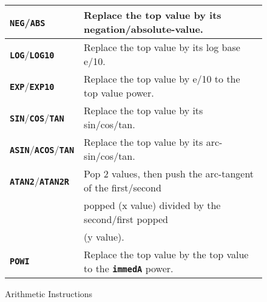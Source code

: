 \documentclass[12pt]{article}
\newcommand{\TT}[1]{{\tt \bfseries #1}}
\newlength{\figurewidth}
\newenvironment{boxedfigure}[1][!btp]%
	{\begin{figure*}[#1]
	 \begin{lrbox}{\figurebox}
	 \begin{minipage}{\figurewidth}

	 \vspace*{1ex}}%
	{
	 \vspace*{1ex}

	 \end{minipage}
	 \end{lrbox}

	 \centering
	 \fbox{\hspace*{0.1in}\usebox{\figurebox}\hspace*{0.1in}}
	 \end{figure*}}
\begin{document}
\begin{boxedfigure}
\begin{center}
\begin{tabular}{|l|l|}
\\\hline
\TT{NEG}/\TT{ABS}
    & Replace the top value by its negation/absolute-value.
\\\hline
\TT{LOG}/\TT{LOG10}
    & Replace the top value by its log base e/10.
\\\hline
\TT{EXP}/\TT{EXP10}
    & Replace the top value by e/10 to the top value power.
\\\hline
\TT{SIN}/\TT{COS}/\TT{TAN}
    & Replace the top value by its sin/cos/tan.
\\\hline
\TT{ASIN}/\TT{ACOS}/\TT{TAN}
    & Replace the top value by its arc- sin/cos/tan.
\\\hline
\TT{ATAN2}/\TT{ATAN2R}
    & Pop 2 values, then push the arc-tangent of the first/second \\
    & popped (x value) divided by the second/first popped \\
    & (y value).
\\\hline
\TT{POWI}
    & Replace the top value by the top value to the \TT{immedA} power.
\\\hline
\end{tabular}
\end{center}
\caption{Arithmetic Instructions}
\label{ARITHMETIC-INSTRUCTIONS}
\end{boxedfigure}

\pagebreak
\end{document}
